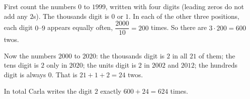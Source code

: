 First count the numbers $0$ to $1999$, written with four digits (leading zeros do not add any $2$s). The thousands digit is $0$ or $1$. In each of the other three positions, each digit $0$--$9$ appears equally often, $\dfrac{2000}{10}=200$ times. So there are $3\cdot200=600$ twos.

Now the numbers $2000$ to $2020$: the thousands digit is $2$ in all $21$ of them; the tens digit is $2$ only in $2020$; the units digit is $2$ in $2002$ and $2012$; the hundreds digit is always $0$. That is $21+1+2=24$ twos.

In total Carla writes the digit $2$ exactly $600+24=\boxed{624}$ times.
